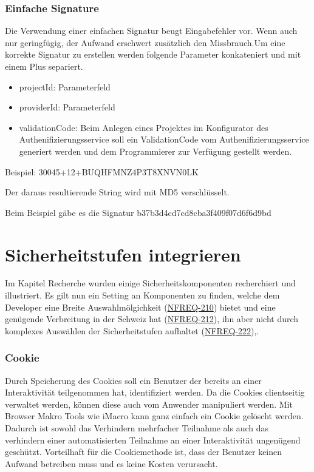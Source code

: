 \subsubsection{Einfache Signature}\label{einfache-signature}

Die Verwendung einer einfachen Signatur beugt Eingabefehler vor. Wenn
auch nur geringfügig, der Aufwand erschwert zusätzlich den Missbrauch.Um
eine korrekte Signatur zu erstellen werden folgende Parameter
konkateniert und mit einem Plus separiert.

\begin{itemize}
\tightlist
\item
  projectId: Parameterfeld
\item
  providerId: Parameterfeld
\item
  validationCode: Beim Anlegen eines Projektes im Konfigurator des
  Authenifizierungsservice soll ein ValidationCode vom
  Authenifizierungsservice generiert werden und dem Programmierer zur
  Verfügung gestellt werden.
\end{itemize}

Beispiel: 30045+12+BUQHFMNZ4P3T8XNVN0LK

Der daraus resultierende String wird mit MD5 verschlüsselt.

Beim Beispiel gäbe es die Signatur b37b3d4cd7cd8cba3f409f07d6f6d9bd

\newpage

\section{Sicherheitstufen
integrieren}\label{sicherheitstufen-integrieren}

Im Kapitel Recherche wurden einige Sicherheitskomponenten recherchiert
und illustriert. Es gilt nun ein Setting an Komponenten zu finden,
welche dem Developer eine Breite Auswahlmölgichkeit
(\protect\hyperlink{ux5cux23ux5cux23NFREQ-210}{NFREQ-210}) bietet und
eine genügende Verbreitung in der Schweiz hat
(\protect\hyperlink{ux5cux23ux5cux23NFREQ-212}{NFREQ-212}), ihn aber
nicht durch komplexes Auswählen der Sicherheitstufen aufhaltet
(\protect\hyperlink{ux5cux23ux5cux23NFREQ-222}{NFREQ-222}),.

\subsubsection{Cookie}\label{cookie-1}

Durch Speicherung des Cookies soll ein Benutzer der bereits an einer
Interaktivität teilgenommen hat, identifiziert werden. Da die Cookies
clientseitig verwaltet werden, können diese auch vom Anwender
manipuliert werden. Mit Browser Makro Tools wie iMacro kann ganz einfach
ein Cookie gelöscht werden. Dadurch ist sowohl das Verhindern mehrfacher
Teilnahme als auch das verhindern einer automatisierten Teilnahme an
einer Interaktivität ungenügend geschützt. Vorteilhaft für die
Cookiemethode ist, dass der Benutzer keinen Aufwand betreiben muss und
es keine Kosten verursacht.

